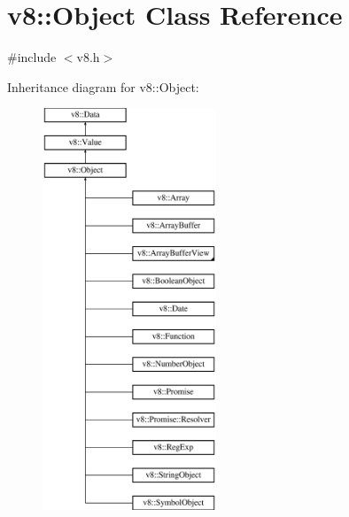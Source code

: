 \hypertarget{classv8_1_1_object}{}\section{v8\+:\+:Object Class Reference}
\label{classv8_1_1_object}


{\ttfamily \#include $<$v8.\+h$>$}

Inheritance diagram for v8\+:\+:Object\+:\begin{figure}[H]
\begin{center}
\leavevmode
\includegraphics[height=12.000000cm]{classv8_1_1_object}
\end{center}
\end{figure}
